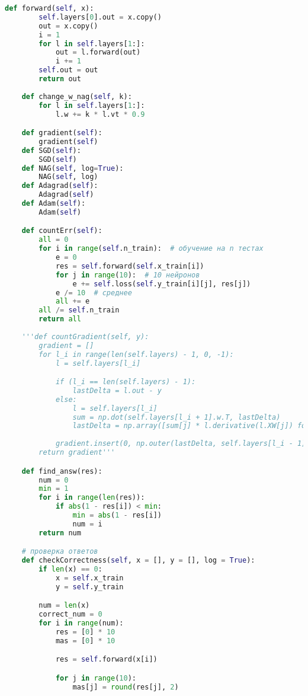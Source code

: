 \documentclass[a4paper, 14pt]{extarticle}
\begin{document}
\begin{lstlisting}[language=Python,caption={main.py},label={lst:code1}]
    def forward(self, x):
        self.layers[0].out = x.copy()
        out = x.copy()
        i = 1
        for l in self.layers[1:]:
            out = l.forward(out)
            i += 1
        self.out = out
        return out
    
    def change_w_nag(self, k):
        for l in self.layers[1:]:
            l.w += k * l.vt * 0.9

    def gradient(self):
        gradient(self)
    def SGD(self):
        SGD(self)
    def NAG(self, log=True):
        NAG(self, log)
    def Adagrad(self):
        Adagrad(self)
    def Adam(self):
        Adam(self)

    def countErr(self):
        all = 0
        for i in range(self.n_train):  # обучение на n тестах
            e = 0
            res = self.forward(self.x_train[i])
            for j in range(10):  # 10 нейронов
                e += self.loss(self.y_train[i][j], res[j])
            e /= 10  # среднее
            all += e
        all /= self.n_train
        return all
    
    '''def countGradient(self, y):
        gradient = []
        for l_i in range(len(self.layers) - 1, 0, -1):
            l = self.layers[l_i]

            if (l_i == len(self.layers) - 1):
                lastDelta = l.out - y
            else:
                l = self.layers[l_i]
                sum = np.dot(self.layers[l_i + 1].w.T, lastDelta)
                lastDelta = np.array([sum[j] * l.derivative(l.XW[j]) for j in range(l.n_neurons)])
                
            gradient.insert(0, np.outer(lastDelta, self.layers[l_i - 1].out))
        return gradient'''

    def find_answ(res):
        num = 0
        min = 1
        for i in range(len(res)):
            if abs(1 - res[i]) < min:
                min = abs(1 - res[i])
                num = i
        return num

    # проверка ответов
    def checkCorrectness(self, x = [], y = [], log = True):
        if len(x) == 0:
            x = self.x_train
            y = self.y_train

        num = len(x)
        correct_num = 0
        for i in range(num):
            res = [0] * 10
            mas = [0] * 10

            res = self.forward(x[i])

            for j in range(10):
                mas[j] = round(res[j], 2)


\end{lstlisting}
\end{document}
